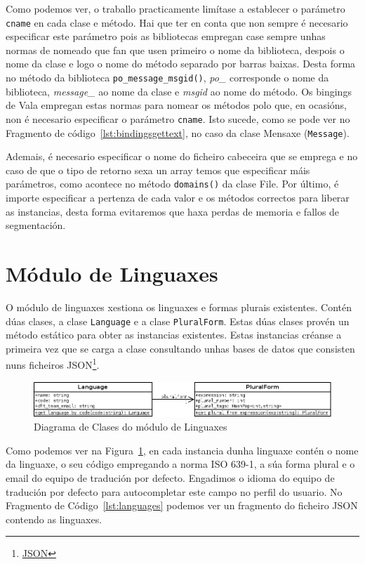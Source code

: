 Como podemos ver, o traballo practicamente limítase a establecer o parámetro \lstinline{cname} en cada clase e método. Hai que ter en conta que non sempre é necesario especificar este parámetro pois as bibliotecas empregan case sempre unhas normas de nomeado que fan que usen primeiro o nome da biblioteca, despois o nome da clase e logo o nome do método separado por barras baixas. Desta forma no método da biblioteca \lstinline{po_message_msgid()}, \emph{po\_} corresponde o nome da biblioteca, \emph{message\_} ao nome da clase e \emph{msgid} ao nome do método. Os bingings de Vala empregan estas normas para nomear os métodos polo que, en ocasións, non é necesario especificar o parámetro \lstinline{cname}. Isto sucede, como se pode ver no Fragmento de código~\ref{lst:bindingsgettext}, no caso da clase Mensaxe (\lstinline{Message}).

Ademais, é necesario especificar o nome do ficheiro cabeceira que se emprega e no caso de que o tipo de retorno sexa un array temos que especificar máis parámetros, como acontece no método \lstinline{domains()} da clase File. Por último, é importe especificar a pertenza de cada valor e os métodos correctos para liberar as instancias, desta forma evitaremos que haxa perdas de memoria e fallos de segmentación.

\section{Módulo de Linguaxes}
O módulo de linguaxes xestiona os linguaxes e formas plurais existentes. Contén dúas clases, a clase \lstinline{Language} e a clase \lstinline{PluralForm}. Estas dúas clases provén un método estático para obter as instancias existentes. Estas instancias créanse a primeira vez que se carga a clase consultando unhas bases de datos que consisten nuns ficheiros JSON\footnote{\href{http://gl.wikipedia.org/wiki/JSON}{JSON}}.

\begin{figure}[h!]
    \centering
    \includegraphics[width=\textwidth]{img/languages.png}
    \caption{Diagrama de Clases do módulo de Linguaxes}
    \label{fig:dia_class:languages}
\end{figure}

Como podemos ver na Figura~\ref{fig:dia_class:languages}, en cada instancia dunha linguaxe contén o nome da linguaxe, o seu código empregando a norma ISO 639-1, a súa forma plural e o email do equipo de tradución por defecto. Engadimos o idioma do equipo de tradución por defecto para autocompletar este campo no perfil do usuario. No Fragmento de Código~\ref{lst:languages} podemos ver un fragmento do ficheiro JSON contendo as linguaxes.

